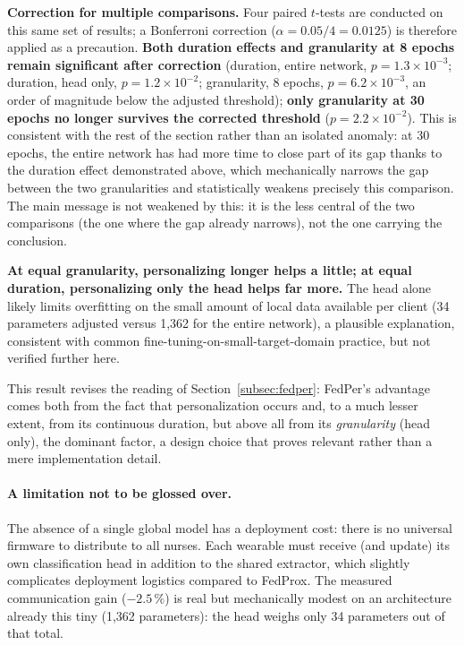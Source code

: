 \documentclass{article}
\begin{document}
\textbf{Correction for multiple comparisons.} Four paired $t$-tests are conducted
on this same set of results; a Bonferroni correction ($\alpha = 0.05/4 = 0.0125$)
is therefore applied as a precaution. \textbf{Both duration effects and
granularity at 8 epochs remain significant after correction} (duration, entire
network, $p=1.3\times10^{-3}$; duration, head only, $p=1.2\times10^{-2}$;
granularity, 8 epochs, $p=6.2\times10^{-3}$, an order of magnitude below the
adjusted threshold); \textbf{only granularity at 30 epochs no longer survives the
corrected threshold} ($p=2.2\times10^{-2}$). This is consistent with the rest of
the section rather than an isolated anomaly: at 30 epochs, the entire network has
had more time to close part of its gap thanks to the duration effect
demonstrated above, which mechanically narrows the gap between the two
granularities and statistically weakens precisely this comparison. The main
message is not weakened by this: it is the less central of the two comparisons
(the one where the gap already narrows), not the one carrying the conclusion.

\textbf{At equal granularity, personalizing longer helps a little; at equal
duration, personalizing only the head helps far more.} The head alone likely
limits overfitting on the small amount of local data available per client (34
parameters adjusted versus 1,362 for the entire network), a plausible
explanation, consistent with common fine-tuning-on-small-target-domain practice,
but not verified further here.

This result revises the reading of Section~\ref{subsec:fedper}: FedPer's
advantage comes both from the fact that personalization occurs and, to a much
lesser extent, from its continuous duration, but above all from its
\emph{granularity} (head only), the dominant factor, a design choice that proves
relevant rather than a mere implementation detail.

\paragraph{A limitation not to be glossed over.} The absence of a single global
model has a deployment cost: there is no universal firmware to distribute to all
nurses. Each wearable must receive (and update) its own classification head in
addition to the shared extractor, which slightly complicates deployment
logistics compared to FedProx. The measured communication gain ($-2.5\,\%$) is
real but mechanically modest on an architecture already this tiny (1,362
parameters): the head weighs only 34 parameters out of that total.
\end{document}
